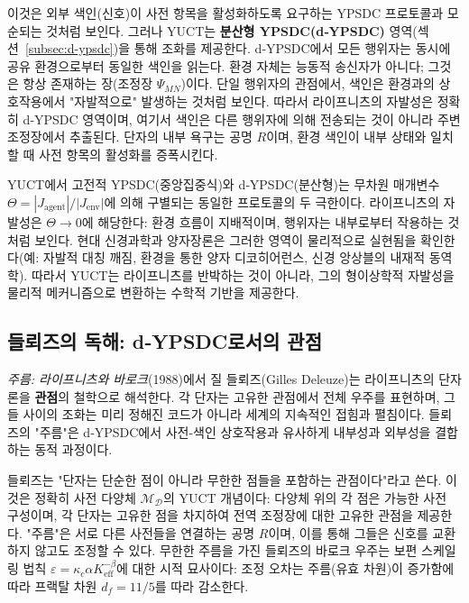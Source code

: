 \documentclass[12pt,a4paper]{article}
\begin{document}
	이것은 외부 색인(신호)이 사전 항목을 활성화하도록 요구하는 YPSDC 프로토콜과 모순되는 것처럼 보인다. 그러나 YUCT는 \textbf{분산형 YPSDC(d‑YPSDC)} 영역(섹션~\ref{subsec:d-ypsdc})을 통해 조화를 제공한다. d‑YPSDC에서 모든 행위자는 동시에 공유 환경으로부터 동일한 색인을 읽는다. 환경 자체는 능동적 송신자가 아니다; 그것은 항상 존재하는 장(조정장 \(\Psi_{MN}\))이다. 단일 행위자의 관점에서, 색인은 환경과의 상호작용에서 "자발적으로" 발생하는 것처럼 보인다. 따라서 라이프니츠의 자발성은 정확히 d‑YPSDC 영역이며, 여기서 색인은 다른 행위자에 의해 전송되는 것이 아니라 주변 조정장에서 추출된다. 단자의 내부 욕구는 공명 \(R\)이며, 환경 색인이 내부 상태와 일치할 때 사전 항목의 활성화를 증폭시킨다.
	
	YUCT에서 고전적 YPSDC(중앙집중식)와 d‑YPSDC(분산형)는 무차원 매개변수 \(\Theta = |J_{\mathrm{agent}}|/|J_{\mathrm{env}}|\)에 의해 구별되는 동일한 프로토콜의 두 극한이다. 라이프니츠의 자발성은 \(\Theta \to 0\)에 해당한다: 환경 흐름이 지배적이며, 행위자는 내부로부터 작용하는 것처럼 보인다. 현대 신경과학과 양자장론은 그러한 영역이 물리적으로 실현됨을 확인한다(예: 자발적 대칭 깨짐, 환경을 통한 양자 디코히어런스, 신경 앙상블의 내재적 동역학). 따라서 YUCT는 라이프니츠를 반박하는 것이 아니라, 그의 형이상학적 자발성을 물리적 메커니즘으로 변환하는 수학적 기반을 제공한다.
	
	\subsection{들뢰즈의 독해: d‑YPSDC로서의 관점}
	
	\emph{주름: 라이프니츠와 바로크}(1988)에서 질 들뢰즈(Gilles Deleuze)는 라이프니츠의 단자론을 \textbf{관점}의 철학으로 해석한다. 각 단자는 고유한 관점에서 전체 우주를 표현하며, 그들 사이의 조화는 미리 정해진 코드가 아니라 세계의 지속적인 접힘과 펼침이다. 들뢰즈의 "주름"은 d‑YPSDC에서 사전-색인 상호작용과 유사하게 내부성과 외부성을 결합하는 동적 과정이다.
	
	들뢰즈는 "단자는 단순한 점이 아니라 무한한 점들을 포함하는 관점이다"라고 쓴다. 이것은 정확히 사전 다양체 \(\mathcal{M}_{\mathcal{D}}\)의 YUCT 개념이다: 다양체 위의 각 점은 가능한 사전 구성이며, 각 단자는 고유한 점을 차지하여 전역 조정장에 대한 고유한 관점을 제공한다. "주름"은 서로 다른 사전들을 연결하는 공명 \(R\)이며, 이를 통해 그들은 신호를 교환하지 않고도 조정할 수 있다. 무한한 주름을 가진 들뢰즈의 바로크 우주는 보편 스케일링 법칙 \(\varepsilon = \kappa_c \alpha K_{\mathrm{eff}}^{-\beta}\)에 대한 시적 묘사이다: 조정 오차는 주름(유효 차원)이 증가함에 따라 프랙탈 차원 \(d_f = 11/5\)를 따라 감소한다.
	
\end{document}
